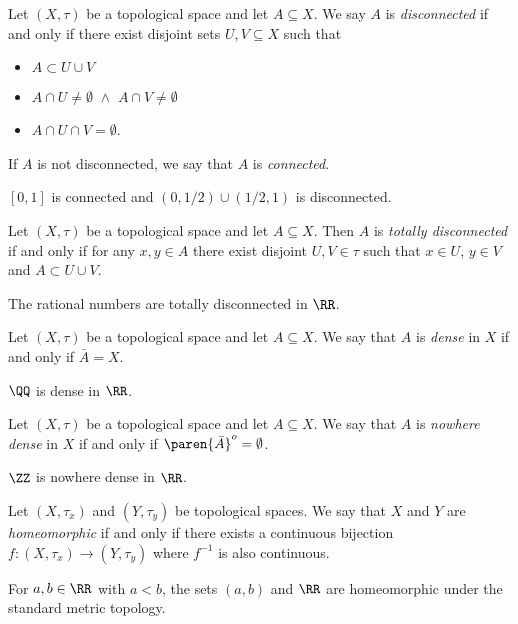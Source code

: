 \begin{definition*}
	Let $(X,\tau)$ be a topological space and let $A\subseteq X$.
	We say $A$ is \textit{disconnected} if and only if there exist disjoint sets $U,V\subseteq X$ such that
	\begin{itemize}
		\item $A\subset U\cup V$
		\item $A\cap U\neq\emptyset\,\,\wedge\,\, A\cap V\neq\emptyset$
		\item $A\cap U\cap V=\emptyset$.
	\end{itemize}
	If $A$ is not disconnected, we say that $A$ is \textit{connected}.
\end{definition*}
\begin{example*}
	$[0,1]$ is connected and $(0,1/2)\cup(1/2,1)$ is disconnected.
\end{example*}

\begin{definition*}
	Let $(X,\tau)$ be a topological space and let $A\subseteq X$.
	Then $A$ is \textit{totally disconnected} if and only if for any $x,y\in A$ there exist disjoint $U,V\in\tau$ such that $x\in U$, $y\in V$ and $A\subset U\cup V$.
\end{definition*}
\begin{example*}
	The rational numbers are totally disconnected in $\RR$.
\end{example*}

\begin{definition*}
	Let $(X,\tau)$ be a topological space and let $A\subseteq X$.
	We say that $A$ is \textit{dense} in $X$ if and only if $\bar{A}=X$.
\end{definition*}
\begin{example*}
	$\QQ$ is dense in $\RR$.
\end{example*}

\begin{definition*}
	Let $(X,\tau)$ be a topological space and let $A\subseteq X$.
	We say that $A$ is \textit{nowhere dense} in $X$ if and only if $\paren{\bar{A}}^o=\emptyset$.
\end{definition*}
\begin{example*}
	$\ZZ$ is nowhere dense in $\RR$.
\end{example*}

\begin{definition*}
	Let $(X,\tau_x)$ and $(Y,\tau_y)$ be topological spaces.
	We say that $X$ and $Y$ are \textit{homeomorphic} if and only if there exists a continuous bijection $f:(X,\tau_x)\rightarrow(Y,\tau_y)$ where $f^{-1}$ is also continuous.
\end{definition*}
\begin{example*}
	For $a,b\in\RR$ with $a<b$, the sets $(a,b)$ and $\RR$ are homeomorphic under the standard metric topology.
\end{example*}


